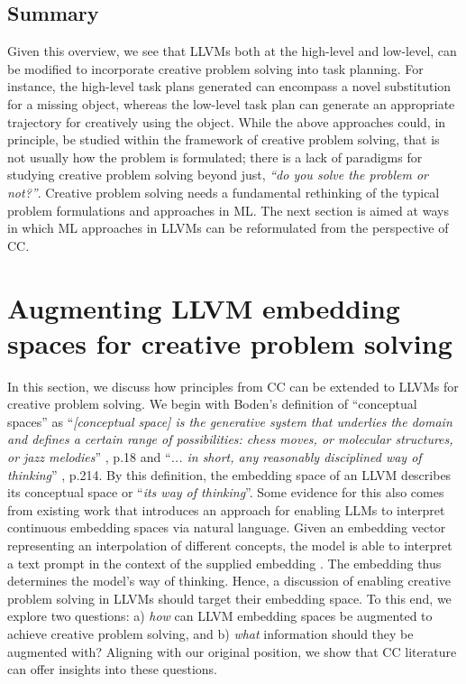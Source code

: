\subsection{Summary} Given this overview, we see that LLVMs both at the high-level and low-level, can be modified to incorporate creative problem solving into task planning. For instance, the high-level task plans generated can encompass a novel substitution for a missing object, whereas the low-level task plan can generate an appropriate trajectory for creatively using the object. While the above approaches could, in principle, be studied within the framework of creative problem solving, that is not usually how the problem is formulated; there is a lack of paradigms for studying creative problem solving beyond just, \textit{``do you solve the problem or not?''}. Creative problem solving needs a fundamental rethinking of the typical problem formulations and approaches in ML. The next section is aimed at ways in which ML approaches in LLVMs can be reformulated from the perspective of CC.


\section{Augmenting LLVM embedding spaces for creative problem solving}
\label{sec:augmenting}
In this section, we discuss how principles from CC can be extended to LLVMs for creative problem solving. We begin with Boden's definition of ``conceptual spaces'' as ``\textit{[conceptual space] is the generative system that underlies the domain and defines a certain range of possibilities: chess moves, or molecular structures, or jazz melodies}'' \cite{boden2005whatiscreativity}, p.18 and ``\textit{... in short, any reasonably disciplined way of thinking}'' \cite{boden1998creativity}, p.214. By this definition, the embedding space of an LLVM describes its conceptual space or ``\textit{its way of thinking}''. Some evidence for this also comes from existing work that introduces an approach for enabling LLMs to interpret continuous embedding spaces via natural language. Given an embedding vector representing an interpolation of different concepts, the model is able to interpret a text prompt in the context of the supplied embedding  \cite{tennenholtz2023demystifying}. The embedding thus determines the model's way of thinking. Hence, a discussion of enabling creative problem solving in LLVMs should target their embedding space. To this end, we explore two questions: a) \textit{how} can LLVM embedding spaces be augmented to achieve creative problem solving, and b) \textit{what} information should they be augmented with? Aligning with our original position, we show that CC literature can offer insights into these questions.


